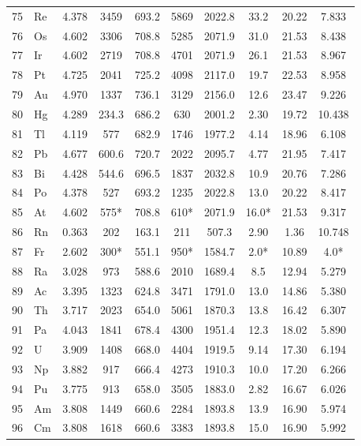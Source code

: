 \documentclass[12pt,a4paper]{article}
\theoremstyle{remark}
\begin{document}
\begin{longtable}{@{}llcccccccc@{}}
		75 & Re  & 4.378 & 3459   & 693.2  & 5869   & 2022.8 & 33.2  & 20.22 & 7.833 \\
		76 & Os  & 4.602 & 3306   & 708.8  & 5285   & 2071.9 & 31.0  & 21.53 & 8.438 \\
		77 & Ir  & 4.602 & 2719   & 708.8  & 4701   & 2071.9 & 26.1  & 21.53 & 8.967 \\
		78 & Pt  & 4.725 & 2041   & 725.2  & 4098   & 2117.0 & 19.7  & 22.53 & 8.958 \\
		79 & Au  & 4.970 & 1337   & 736.1  & 3129   & 2156.0 & 12.6  & 23.47 & 9.226 \\
		80 & Hg  & 4.289 & 234.3  & 686.2  & 630    & 2001.2 & 2.30  & 19.72 & 10.438 \\
		81 & Tl  & 4.119 & 577    & 682.9  & 1746   & 1977.2 & 4.14  & 18.96 & 6.108 \\
		82 & Pb  & 4.677 & 600.6  & 720.7  & 2022   & 2095.7 & 4.77  & 21.95 & 7.417 \\
		83 & Bi  & 4.428 & 544.6  & 696.5  & 1837   & 2032.8 & 10.9  & 20.76 & 7.286 \\
		84 & Po  & 4.378 & 527    & 693.2  & 1235   & 2022.8 & 13.0  & 20.22 & 8.417 \\
		85 & At  & 4.602 & 575*   & 708.8  & 610*   & 2071.9 & 16.0* & 21.53 & 9.317 \\
		86 & Rn  & 0.363 & 202    & 163.1  & 211    & 507.3  & 2.90  & 1.36  & 10.748 \\
		87 & Fr  & 2.602 & 300*   & 551.1  & 950*   & 1584.7 & 2.0*  & 10.89 & 4.0* \\
		88 & Ra  & 3.028 & 973    & 588.6  & 2010   & 1689.4 & 8.5   & 12.94 & 5.279 \\
		89 & Ac  & 3.395 & 1323   & 624.8  & 3471   & 1791.0 & 13.0  & 14.86 & 5.380 \\
		90 & Th  & 3.717 & 2023   & 654.0  & 5061   & 1870.3 & 13.8  & 16.42 & 6.307 \\
		91 & Pa  & 4.043 & 1841   & 678.4  & 4300   & 1951.4 & 12.3  & 18.02 & 5.890 \\
		92 & U   & 3.909 & 1408   & 668.0  & 4404   & 1919.5 & 9.14  & 17.30 & 6.194 \\
		93 & Np  & 3.882 & 917    & 666.4  & 4273   & 1910.3 & 10.0  & 17.20 & 6.266 \\
		94 & Pu  & 3.775 & 913    & 658.0  & 3505   & 1883.0 & 2.82  & 16.67 & 6.026 \\
		95 & Am  & 3.808 & 1449   & 660.6  & 2284   & 1893.8 & 13.9  & 16.90 & 5.974 \\
		96 & Cm  & 3.808 & 1618   & 660.6  & 3383   & 1893.8 & 15.0  & 16.90 & 5.992 \\

\end{longtable}
\end{document}
